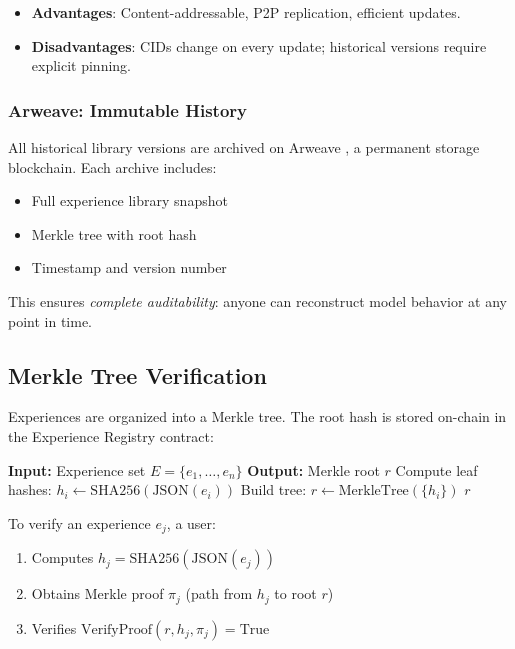 \begin{itemize}
\item \textbf{Advantages}: Content-addressable, P2P replication, efficient updates.
\item \textbf{Disadvantages}: CIDs change on every update; historical versions require explicit pinning.
\end{itemize}

\subsubsection{Arweave: Immutable History}

All historical library versions are archived on Arweave \cite{arweave2018whitepaper}, a permanent storage blockchain. Each archive includes:
\begin{itemize}
\item Full experience library snapshot
\item Merkle tree with root hash
\item Timestamp and version number
\end{itemize}

This ensures \textit{complete auditability}: anyone can reconstruct model behavior at any point in time.

\subsection{Merkle Tree Verification}

Experiences are organized into a Merkle tree. The root hash is stored on-chain in the Experience Registry contract:

\begin{algorithm}[H]
\caption{Merkle Tree Construction}
\begin{algorithmic}[1]
\STATE \textbf{Input:} Experience set $E = \{e_1, \ldots, e_n\}$
\STATE \textbf{Output:} Merkle root $r$
\STATE Compute leaf hashes: $h_i \leftarrow \text{SHA256}(\text{JSON}(e_i))$
\STATE Build tree: $r \leftarrow \text{MerkleTree}(\{h_i\})$
\RETURN $r$
\end{algorithmic}
\end{algorithm}

To verify an experience $e_j$, a user:
\begin{enumerate}
\item Computes $h_j = \text{SHA256}(\text{JSON}(e_j))$
\item Obtains Merkle proof $\pi_j$ (path from $h_j$ to root $r$)
\item Verifies $\text{VerifyProof}(r, h_j, \pi_j) = \text{True}$
\end{enumerate}

